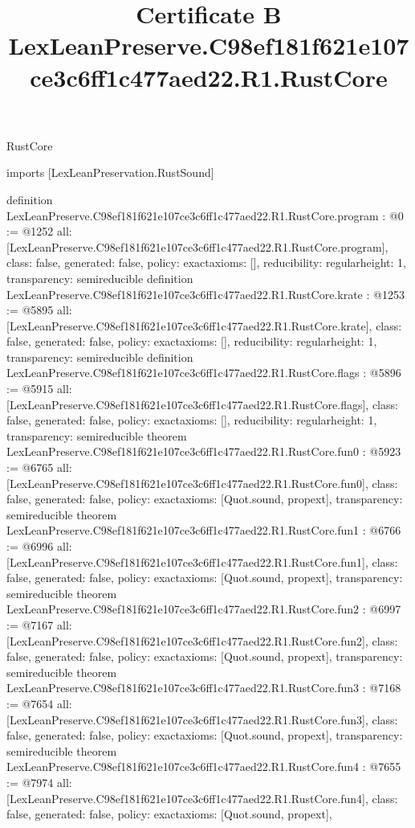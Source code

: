 \begin{lexlean}{RustCore}
\title{Certificate B LexLeanPreserve.C98ef181f621e107ce3c6ff1c477aed22.R1.RustCore}
\begin{coremodule}
imports [LexLeanPreservation.RustSound]

definition LexLeanPreserve.C98ef181f621e107ce3c6ff1c477aed22.R1.RustCore.program : @0 := @1252 {
  all: [LexLeanPreserve.C98ef181f621e107ce3c6ff1c477aed22.R1.RustCore.program],
  class: false,
  generated: false,
  policy: exact{axioms: []},
  reducibility: regular{height: 1},
  transparency: semireducible
}
definition LexLeanPreserve.C98ef181f621e107ce3c6ff1c477aed22.R1.RustCore.krate : @1253 := @5895 {
  all: [LexLeanPreserve.C98ef181f621e107ce3c6ff1c477aed22.R1.RustCore.krate],
  class: false,
  generated: false,
  policy: exact{axioms: []},
  reducibility: regular{height: 1},
  transparency: semireducible
}
definition LexLeanPreserve.C98ef181f621e107ce3c6ff1c477aed22.R1.RustCore.flags : @5896 := @5915 {
  all: [LexLeanPreserve.C98ef181f621e107ce3c6ff1c477aed22.R1.RustCore.flags],
  class: false,
  generated: false,
  policy: exact{axioms: []},
  reducibility: regular{height: 1},
  transparency: semireducible
}
theorem LexLeanPreserve.C98ef181f621e107ce3c6ff1c477aed22.R1.RustCore.fun0 : @5923 := @6765 {
  all: [LexLeanPreserve.C98ef181f621e107ce3c6ff1c477aed22.R1.RustCore.fun0],
  class: false,
  generated: false,
  policy: exact{axioms: [Quot.sound, propext]},
  transparency: semireducible
}
theorem LexLeanPreserve.C98ef181f621e107ce3c6ff1c477aed22.R1.RustCore.fun1 : @6766 := @6996 {
  all: [LexLeanPreserve.C98ef181f621e107ce3c6ff1c477aed22.R1.RustCore.fun1],
  class: false,
  generated: false,
  policy: exact{axioms: [Quot.sound, propext]},
  transparency: semireducible
}
theorem LexLeanPreserve.C98ef181f621e107ce3c6ff1c477aed22.R1.RustCore.fun2 : @6997 := @7167 {
  all: [LexLeanPreserve.C98ef181f621e107ce3c6ff1c477aed22.R1.RustCore.fun2],
  class: false,
  generated: false,
  policy: exact{axioms: [Quot.sound, propext]},
  transparency: semireducible
}
theorem LexLeanPreserve.C98ef181f621e107ce3c6ff1c477aed22.R1.RustCore.fun3 : @7168 := @7654 {
  all: [LexLeanPreserve.C98ef181f621e107ce3c6ff1c477aed22.R1.RustCore.fun3],
  class: false,
  generated: false,
  policy: exact{axioms: [Quot.sound, propext]},
  transparency: semireducible
}
theorem LexLeanPreserve.C98ef181f621e107ce3c6ff1c477aed22.R1.RustCore.fun4 : @7655 := @7974 {
  all: [LexLeanPreserve.C98ef181f621e107ce3c6ff1c477aed22.R1.RustCore.fun4],
  class: false,
  generated: false,
  policy: exact{axioms: [Quot.sound, propext]},
}
\end{coremodule}
\end{lexlean}
